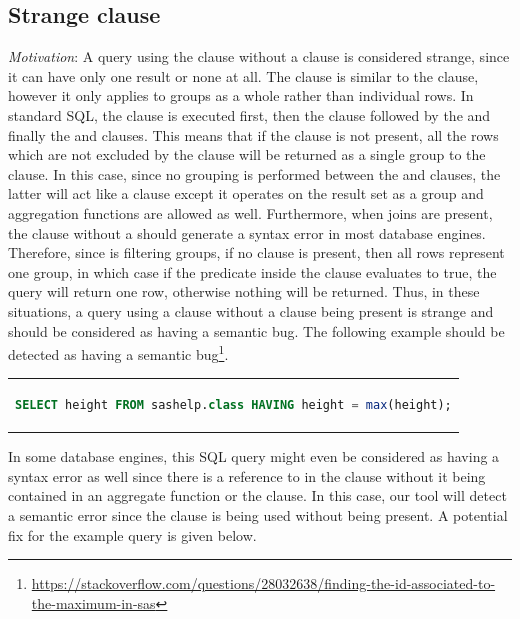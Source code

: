 \subsection{Strange  clause}
\emph{Motivation}: A query using the  clause without a  clause is considered strange, since it can have only one result or none at all. The  clause is similar to the  clause, however it only applies to groups as a whole rather than individual rows. In standard SQL, the  clause is executed first, then the  clause followed by the  and finally the  and  clauses. This means that if the  clause is not present, all the rows which are not excluded by the  clause will be returned as a single group to the  clause. In this case, since no grouping is performed between the  and  clauses, the latter will act like a  clause except it operates on the result set as a group and aggregation functions are allowed as well. Furthermore, when joins are present, the  clause without a  should generate a syntax error in most database engines. Therefore, since  is filtering groups, if no  clause is present, then all rows represent one group, in which case if the predicate inside the  clause evaluates to true, the query will return one row, otherwise nothing will be returned. Thus, in these situations, a query using a  clause without a  clause being present is strange and should be considered as having a semantic bug. The following example should be detected as having a semantic bug\footnote{\url{https://stackoverflow.com/questions/28032638/finding-the-id-associated-to-the-maximum-in-sas}}.

\begin{center}
\begin{tabular}{c}
\begin{lstlisting}[language=SQL]
SELECT height FROM sashelp.class HAVING height = max(height);
\end{lstlisting}
\end{tabular}
\end{center}

In some database engines, this SQL query might even be considered as having a syntax error as well since there is a reference to  in the  clause without it being contained in an aggregate function or the  clause. In this case, our tool will detect a semantic error since the  clause is being used without  being present. A potential fix for the example query is given below.

